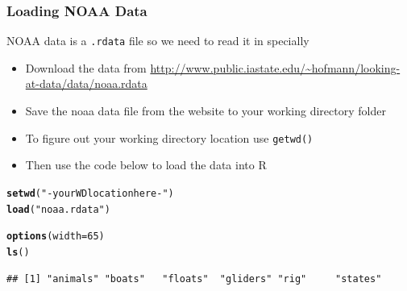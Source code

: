 \documentclass{beamer}\usepackage[]{graphicx}\usepackage[]{color}
\makeatletter
\newcommand{\hlnum}[1]{\textcolor[rgb]{0.686,0.059,0.569}{#1}}%
\newcommand{\hlstr}[1]{\textcolor[rgb]{0.192,0.494,0.8}{#1}}%
\newcommand{\hlstd}[1]{\textcolor[rgb]{0.345,0.345,0.345}{#1}}%
\newcommand{\hlkwc}[1]{\textcolor[rgb]{0.333,0.667,0.333}{#1}}%
\newcommand{\hlkwd}[1]{\textcolor[rgb]{0.737,0.353,0.396}{\textbf{#1}}}%
\newenvironment{kframe}{%
 \def\at@end@of@kframe{}%
 \ifinner\ifhmode%
  \def\at@end@of@kframe{\end{minipage}}%
  \begin{minipage}{\columnwidth}%
 \fi\fi%
 \def\FrameCommand##1{\hskip\@totalleftmargin \hskip-\fboxsep
 \colorbox{shadecolor}{##1}\hskip-\fboxsep
     \hskip-\linewidth \hskip-\@totalleftmargin \hskip\columnwidth}%
 \MakeFramed {\advance\hsize-\width
   \@totalleftmargin\z@ \linewidth\hsize
   \@setminipage}}%
 {\par\unskip\endMakeFramed%
 \at@end@of@kframe}
\newenvironment{knitrout}{}{} %
\makeatother
\begin{document}

\begin{frame}[fragile]
\frametitle{Loading NOAA Data}
NOAA data is a \texttt{.rdata} file so we need to read it in specially
   \begin{itemize}
    \item Download the data from {\small\url{http://www.public.iastate.edu/~hofmann/looking-at-data/data/noaa.rdata}}
    \item Save the noaa data file from the website to your working directory folder
    \item To figure out your working directory location use \texttt{getwd()}
    \item Then use the code below to load the data into R
\end{itemize} 
\small
\begin{knitrout}\footnotesize
{}\color{fgcolor}\begin{kframe}
\begin{alltt}
  \hlkwd{setwd}\hlstd{(}\hlstr{" - your WD location here - "}\hlstd{)}
  \hlkwd{load}\hlstd{(}\hlstr{"noaa.rdata"}\hlstd{)}
\end{alltt}
\end{kframe}
\end{knitrout}

\vspace{-25pt}
\begin{knitrout}\footnotesize
{}\color{fgcolor}\begin{kframe}
\begin{alltt}
\hlkwd{options}\hlstd{(}\hlkwc{width}\hlstd{=}\hlnum{65}\hlstd{)}
  \hlkwd{ls}\hlstd{()}
\end{alltt}
\begin{verbatim}
## [1] "animals" "boats"   "floats"  "gliders" "rig"     "states"
\end{verbatim}
\end{kframe}
\end{knitrout}

    \normalsize
\end{frame}


\end{document}
